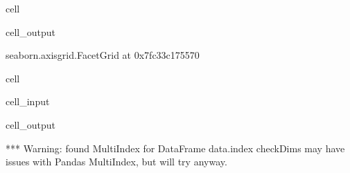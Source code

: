\documentclass[letterpaper,table,10pt,english]{jupyterBook}
\begin{document}
\begin{sphinxuseclass}{cell}
\begin{sphinxVerbatimOutput}
\begin{sphinxuseclass}{cell_output}
\begin{sphinxVerbatim}[commandchars=\\\{\}]
\PYGZlt{}seaborn.axisgrid.FacetGrid at 0x7fc33c175570\PYGZgt{}
\end{sphinxVerbatim}

\noindent{}

\end{sphinxuseclass}\end{sphinxVerbatimOutput}

\end{sphinxuseclass}
\begin{sphinxuseclass}{cell}\begin{sphinxVerbatimInput}

\begin{sphinxuseclass}{cell_input}
\begin{sphinxVerbatim}[commandchars=\\\{\}]
   
       
                      
\end{sphinxVerbatim}

\end{sphinxuseclass}\end{sphinxVerbatimInput}
\begin{sphinxVerbatimOutput}

\begin{sphinxuseclass}{cell_output}
\begin{sphinxVerbatim}[commandchars=\\\{\}]
*** Warning: found MultiIndex for DataFrame data.index \PYGZhy{} checkDims may have issues with Pandas MultiIndex, but will try anyway.
\end{sphinxVerbatim}


\end{sphinxuseclass}
\end{sphinxVerbatimOutput}
\end{sphinxuseclass}
\end{document}
